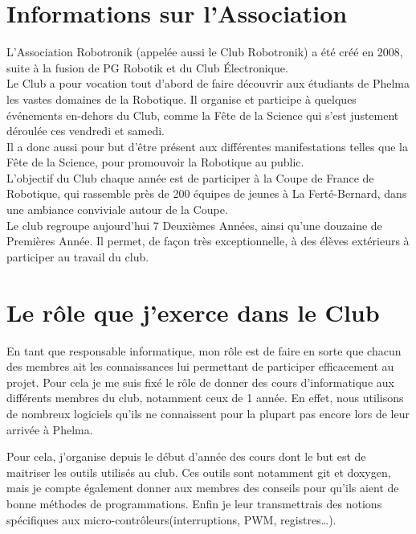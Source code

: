 \documentclass[a4paper,11pt]{article} \usepackage[T1]{fontenc} \usepackage[utf8]{inputenc} \usepackage[francais]{babel}
\begin{document}
\part{Informations sur l'Association}
    L'Association Robotronik (appelée aussi le Club Robotronik) a été créé en 2008, suite à la fusion de PG Robotik
    et du Club Électronique.\\

    Le Club a pour vocation tout d'abord de faire découvrir aux étudiants de Phelma les vastes domaines de la Robotique.
    Il organise et participe à quelques événements en-dehors du Club, comme la Fête de la Science qui s'est justement déroulée ces vendredi et samedi.\\

    Il a donc aussi pour but d'être présent aux différentes manifestations telles que la Fête de la Science,
    pour promouvoir la Robotique au public.\\

    L'objectif du Club chaque année est de participer à la Coupe de France de Robotique, qui rassemble près de
    200 équipes de jeunes à La Ferté-Bernard, dans une ambiance conviviale autour de la Coupe.\\

    Le club regroupe aujourd'hui 7 Deuxièmes Années, ainsi qu'une douzaine de Premières Année. Il permet, de façon très exceptionnelle, à des élèves extérieurs à participer au travail du club.

\part{Le rôle que j'exerce dans le Club}

En tant que responsable informatique, mon rôle est de faire en sorte que chacun des membres ait les connaissances lui permettant de participer efficacement au projet. Pour cela je me suis fixé le rôle de donner des cours d'informatique aux différents membres du club, notamment ceux de 1\ieres{} année. En effet, nous utilisons de nombreux logiciels qu'ils ne connaissent pour la plupart pas encore lors de leur arrivée à Phelma.

Pour cela, j'organise depuis le début d'année des cours dont le but est de maitriser les outils utilisés au club. Ces outils sont notamment git et doxygen, mais je compte également donner aux membres des conseils pour qu'ils aient de bonne méthodes de programmations. Enfin je leur transmettrais des notions spécifiques aux micro-contrôleurs(interruptions, PWM, registres…).
\end{document}
